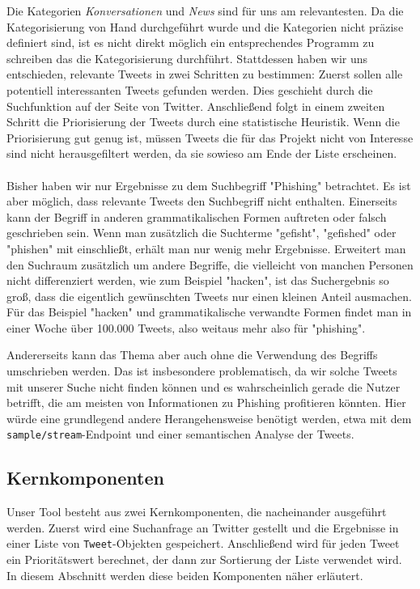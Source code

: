 \documentclass[runningheads]{llncs}
\begin{document}
Die Kategorien \textit{Konversationen} und \textit{News} sind für uns am relevantesten.
Da die Kategorisierung von Hand durchgeführt wurde und die Kategorien nicht präzise definiert sind, ist es nicht direkt möglich ein entsprechendes Programm zu schreiben das die Kategorisierung durchführt.
Stattdessen haben wir uns entschieden, relevante Tweets in zwei Schritten zu bestimmen:
Zuerst sollen alle potentiell interessanten Tweets gefunden werden.
Dies geschieht durch die Suchfunktion auf der Seite von Twitter.
Anschließend folgt in einem zweiten Schritt die Priorisierung der Tweets durch eine statistische Heuristik.
Wenn die Priorisierung gut genug ist, müssen Tweets die für das Projekt nicht von Interesse sind nicht herausgefiltert werden, da sie sowieso am Ende der Liste erscheinen.


\paragraph{} Bisher haben wir nur Ergebnisse zu dem Suchbegriff "Phishing" betrachtet.
Es ist aber möglich, dass relevante Tweets den Suchbegriff nicht enthalten.
Einerseits kann der Begriff in anderen grammatikalischen Formen auftreten oder falsch geschrieben sein.
Wenn man zusätzlich die Suchterme "gefisht", "gefished" oder "phishen" mit einschließt, erhält man nur wenig mehr Ergebnisse.
Erweitert man den Suchraum zusätzlich um andere Begriffe, die vielleicht von manchen Personen nicht differenziert werden, wie zum Beispiel "hacken", ist das Suchergebnis so groß, dass die eigentlich gewünschten Tweets nur einen kleinen Anteil ausmachen.
Für das Beispiel "hacken" und grammatikalische verwandte Formen findet man in einer Woche über 100.000 Tweets, also weitaus mehr also für "phishing".

Andererseits kann das Thema aber auch ohne die Verwendung des Begriffs umschrieben werden.
Das ist insbesondere problematisch, da wir solche Tweets mit unserer Suche nicht finden können und es wahrscheinlich gerade die Nutzer betrifft, die am meisten von Informationen zu Phishing profitieren könnten.
Hier würde eine grundlegend andere Herangehensweise benötigt werden, etwa mit dem \texttt{sample/stream}-Endpoint und einer semantischen Analyse der Tweets.

\subsection{Kernkomponenten}
Unser Tool besteht aus zwei Kernkomponenten, die nacheinander ausgeführt werden.
Zuerst wird eine Suchanfrage an Twitter gestellt und die Ergebnisse in einer Liste von \texttt{Tweet}-Objekten gespeichert.
Anschließend wird für jeden Tweet ein Prioritätswert berechnet, der dann zur Sortierung der Liste verwendet wird.
In diesem Abschnitt werden diese beiden Komponenten näher erläutert.
\end{document}
